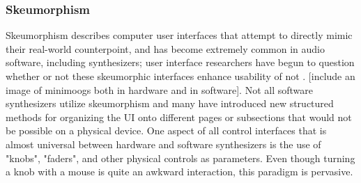 \subsubsection{Skeumorphism}
Skeumorphism describes computer user interfaces that attempt to directly mimic their real-world counterpoint, and has become extremely common in audio software, including synthesizers; user interface researchers have begun to question whether or not these skeumorphic interfaces enhance usability of not \cite{lindh2018beyond}. [include an image of minimoogs both in hardware and in software]. Not all software synthesizers utilize skeumorphism and many have introduced new structured methods for organizing the UI onto different pages or subsections that would not be possible on a physical device. One aspect of all control interfaces that is almost universal between hardware and software synthesizers is the use of "knobs", "faders", and other physical controls as parameters. Even though turning a knob with a mouse is quite an awkward interaction, this paradigm is pervasive.





